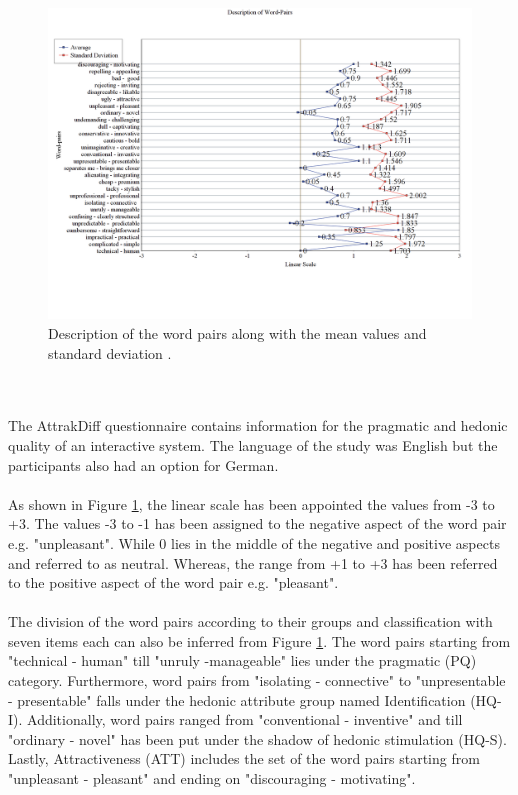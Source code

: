\begin{figure}[!h]
    \centering
    \includegraphics[width=1\textwidth]{img/Desc_of_Word_Pairs.png}
    \caption{Description of the word pairs along with the mean values and standard deviation \cite{attrakdiff}.}
    \label{fig:descofWordPair}
\end{figure}
\\~\\
The AttrakDiff questionnaire contains information for the pragmatic and hedonic quality of an interactive system. The language of the study was English but the participants also had an option for German.
\\~\\
As shown in Figure \ref{fig:descofWordPair}, the linear scale has been appointed the values from -3 to +3. The values -3 to -1 has been assigned to the negative aspect of the word pair e.g. "unpleasant". While 0 lies in the middle of the negative and positive aspects and referred to as neutral. Whereas, the range from +1 to +3 has been referred to the positive aspect of the word pair e.g. "pleasant".
\\~\\
The division of the word pairs according to their groups and classification with seven items each can also be inferred from Figure \ref{fig:descofWordPair}. The word pairs starting from "technical - human" till "unruly -manageable" lies under the pragmatic (PQ) category. Furthermore, word pairs from "isolating - connective" to "unpresentable - presentable" falls under the hedonic attribute group named Identification (HQ-I). Additionally, word pairs ranged from "conventional - inventive" and till "ordinary - novel" has been put under the shadow of hedonic stimulation (HQ-S). Lastly, Attractiveness (ATT) includes the set of the word pairs starting from "unpleasant - pleasant" and ending on "discouraging - motivating". 
